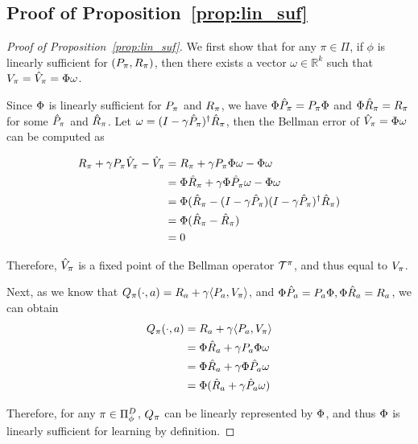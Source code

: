 \subsection{Proof of Proposition~\ref{prop:lin_suf}}
\label{proof:lin_suf}
\begin{proof}[Proof of Proposition~\ref{prop:lin_suf}]

We first show that for any $\pi\in\Pi$, if $\phi$ is linearly sufficient for $(P_\pi,R_\pi)$, then there exists a vector $\omega \in \mathbb{R}^k$ such that $V_\pi = \hat{V}_\pi = \Phi\omega$.

Since $\Phi$ is linearly sufficient for $P_\pi$ and $R_\pi$, we have $\Phi \hat{P}_\pi = P_\pi \Phi$ and $\Phi \hat{R}_\pi = R_\pi$ for some $\hat{P}_\pi$ and $\hat{R}_\pi$. Let $\omega = (I-\gamma \hat{P}_\pi)^{\dagger} \hat{R}_\pi$, then the Bellman error of $\hat{V}_\pi=\Phi\omega$ can be computed as

\begin{align*}
    R_\pi + \gamma P_\pi\hat{V}_\pi - \hat{V}_\pi &= R_\pi + \gamma P_\pi\Phi\omega - \Phi\omega \\
    &= \Phi \hat{R}_\pi + \gamma \Phi \hat{P}_\pi \omega - \Phi\omega \\
    &= \Phi (\hat{R}_\pi - (I-\gamma\hat{P}_\pi) (I-\gamma \hat{P}_\pi)^{\dagger} \hat{R}_\pi ) \\
    &= \Phi (\hat{R}_\pi - \hat{R}_\pi) \\
    &= 0
\end{align*}

Therefore, $\hat{V}_\pi$ is a fixed point of the Bellman operator $\mathcal{T}^\pi$, and thus equal to $V_\pi$.


Next, as we know that $Q_\pi(\cdot,a) = R_a + \gamma \langle P_a, V_\pi \rangle$, and $\Phi\hat{P}_a=P_a\Phi, \Phi\hat{R}_a=R_a$, we can obtain
\begin{align*}
    Q_\pi(\cdot,a) &= R_a + \gamma \langle P_a, V_\pi \rangle \\
    &= \Phi\hat{R}_a + \gamma P_a \Phi \omega \\
    &= \Phi\hat{R}_a + \gamma \Phi\hat{P}_a \omega \\
    &= \Phi (\hat{R}_a + \gamma \hat{P}_a \omega)
\end{align*}

Therefore, for any $\pi\in\Pi_{\phi}^D$, $Q_\pi$ can be linearly represented by $\Phi$, and thus $\Phi$ is linearly sufficient for learning by definition.

\end{proof}


